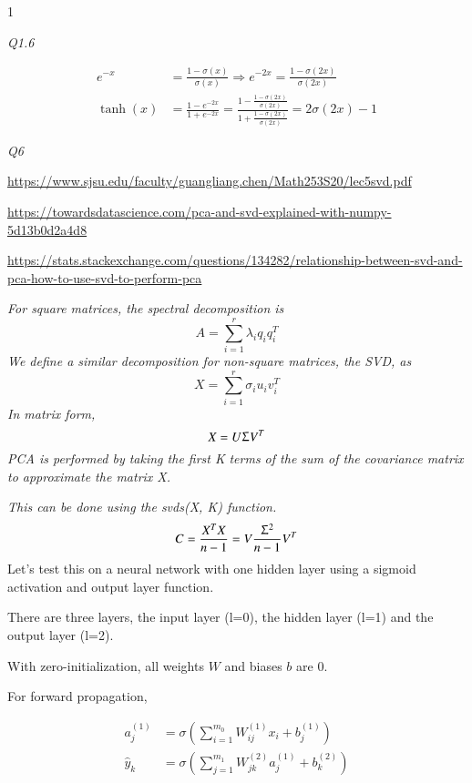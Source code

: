 \documentclass{scrbook}
\begin{document}
1

\textit{Q1.6}

\begin{align*}
e^{-x}&=\frac{1-\sigma \left(x\right)}{\sigma \left(x\right)}\Longrightarrow e^{-2x}=\frac{1-\sigma \left(2x\right)}{\sigma \left(2x\right)} \\
\tanh \left(x\right)&=\frac{1-e^{-2x}}{1+e^{-2x}}=\frac{1-\frac{1-\sigma \left(2x\right)}{\sigma \left(2x\right)}}{1+\frac{1-\sigma \left(2x\right)}{\sigma \left(2x\right)}}=2\sigma \left(2x\right)-1 
\end{align*}

\textit{Q6}

\url{https://www.sjsu.edu/faculty/guangliang.chen/Math253S20/lec5svd.pdf}

\url{https://towardsdatascience.com/pca-and-svd-explained-with-numpy-5d13b0d2a4d8}

\url{https://stats.stackexchange.com/questions/134282/relationship-between-svd-and-pca-how-to-use-svd-to-perform-pca}

\textit{For square matrices, the spectral decomposition is}
\begin{equation*}
A={\sum }_{i=1}^{r}\lambda _{i}q_{i}{q}_{i}^{T}
\end{equation*}
\textit{We define a similar decomposition for non-square matrices, the SVD, as}
\begin{equation*}
X={\sum }_{i=1}^{r}\sigma _{i}u_{i}{v}_{i}^{T}
\end{equation*}
\textit{In matrix form,}
\begin{equation*}
X=U\Upsigma V^{T}
\end{equation*}
\textit{PCA is performed by taking the first K} \textit{terms of the sum of the covariance matrix to approximate the matrix X.}

\textit{This can be done using the svds(X, K) function.}
\begin{equation*}
C=\frac{X^{T}X}{n-1}=V\frac{\Upsigma ^{2}}{n-1}V^{T}
\end{equation*}
\pagebreak
Let’s test this on a neural network with one hidden layer using a sigmoid activation and output layer function.

There are three layers, the input layer (l=0), the hidden layer (l=1) and the output layer (l=2).

With zero-initialization, all weights $W$ and biases $b$ are 0.

For forward propagation, 

\begin{align*}
{a}_{j}^{\left(1\right)}&=\sigma \left({\sum }_{i=1}^{m_{0}}{W}_{ij}^{\left(1\right)}x_{i}+{b}_{j}^{\left(1\right)}\right) \\
\hat{y}_{k}&=\sigma \left({\sum }_{j=1}^{m_{1}}{W}_{jk}^{\left(2\right)}{a}_{j}^{\left(1\right)}+{b}_{k}^{\left(2\right)}\right) 
\end{align*}
\end{document}
